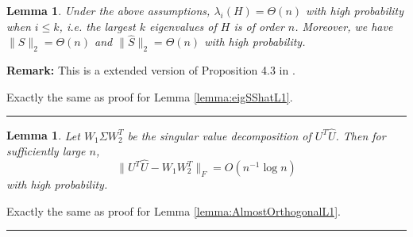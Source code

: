 \documentclass[a4paper]{article}
\newenvironment{proof}{{\bf Proof:  }}{\hfill\rule{2mm}{2mm}}
\newtheorem{lemma}[fact]{Lemma}
\begin{document}
\begin{lemma}
\label{lemma:eigSShat}
Under the above assumptions, $\lambda_i(H) = \Theta(n)$ with high probability when $i \le k$, i.e. the largest $k$ eigenvalues of $H$ is of order $n$. Moreover, we have $\| S \|_2 = \Theta(n)$ and $\| \hat{S} \|_2 = \Theta(n)$ with high probability.
\end{lemma}
\textbf{Remark:} This is a extended version of Proposition 4.3 in \cite{sussman2014consistent}.

\noindent
\begin{proof}
Exactly the same as proof for Lemma \ref{lemma:eigSShatL1}.
\end{proof}


\begin{lemma}
\label{lemma:AlmostOrthogonal}
Let $W_1 \Sigma W_2^T$ be the singular value decomposition of $U^T \hat{U}$. Then for sufficiently large $n$, 
\[
	\| U^T \hat{U} - W_1 W_2^T \|_F = O(n^{-1} \log n)
\]
with high probability.
\end{lemma}
\begin{proof}
Exactly the same as proof for Lemma \ref{lemma:AlmostOrthogonalL1}.
\end{proof}
\end{document}
